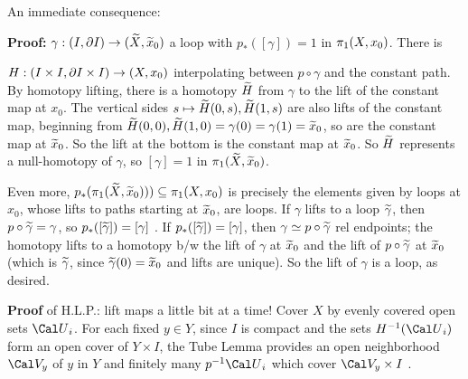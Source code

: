 An immediate consequence: 

\msk  



\msk

{\bf Proof:} $\gamma:(I,\partial I)\rightarrow (\widetilde{X},\widetilde{x}_0)$ a 
loop with $p_*([\gamma])=1$ in $\pi_1(X,x_0)$. There is

$H:(I\times I,\partial I\times I)\rightarrow (X,x_0)$ interpolating
between $p\circ\gamma$ and the constant 
path. By homotopy lifting, there is a homotopy $\widetilde{H}$ from $\gamma$ to 
the lift of the constant map at $x_0$. The vertical sides 
$s\mapsto \widetilde{H}(0,s),\widetilde{H}(1,s)$ are also lifts of the 
constant map, beginning from 
$\widetilde{H}(0,0),\widetilde{H}(1,0)=\gamma(0)=\gamma(1)=\widetilde{x}_0$, so
are the constant map at $\widetilde{x}_0$. So the lift at the 
bottom is the constant map at $\widetilde{x}_0$. So $\widetilde{H}$
represents a null-homotopy of $\gamma$, so $[\gamma]=1$
in $\pi_1(\widetilde{X},\widetilde{x}_0)$.


\vfill
\eject

Even more, $p_*(\pi_1(\widetilde{X},\widetilde{x}_0)))\subseteq \pi_1(X,x_0)$
is precisely the elements given by loops at $x_0$, 
whose lifts to paths starting at $\widetilde{x}_0$, are loops. 
If $\gamma$ lifts
to a loop $\widetilde{\gamma}$, then $p\circ\widetilde{\gamma}=\gamma$, so
$p_*([\widetilde{\gamma}])=[\gamma]$ . If 
$p_*([\widetilde{\gamma}])=[\gamma]$, then $\gamma\simeq p\circ\widetilde{\gamma}$
rel endpoints; the homotopy lifts to 
a homotopy b/w the lift of $\gamma$ at 
$\widetilde{x}_0$ and the lift of $p\circ\widetilde{\gamma}$ at $\widetilde{x}_0$
(which is $\widetilde{\gamma}$, since $\widetilde{\gamma}(0)=\widetilde{x}_0$ and
lifts are unique). So the lift of $\gamma$ is a loop, as desired.

\msk

{\bf Proof} of H.L.P.:  lift maps a little bit at a time! Cover $X$ by
evenly covered open sets ${\Cal U}_i$. For each fixed
$y\in Y$, since $I$ is compact and the sets $H^{-1}({\Cal U}_i)$ form an
open cover of $Y\times I$,
the Tube Lemma provides an open neighborhood 
${\Cal V_y}$ of $y$ in $Y$ and finitely many $p^{-1}{\Cal U}_{i}$ which
cover ${\Cal V_y}\times I$ . 

\msk

